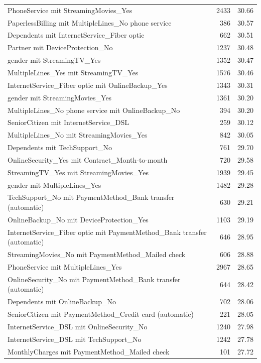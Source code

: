 \documentclass[a4paper,11pt]{article}
\begin{document}
\begin{longtable}{p{9cm}rr}
PhoneService mit StreamingMovies\_Yes & 2433 & 30.66 \\
PaperlessBilling mit MultipleLines\_No phone service & 386 & 30.57 \\
Dependents mit InternetService\_Fiber optic & 662 & 30.51 \\
Partner mit DeviceProtection\_No & 1237 & 30.48 \\
gender mit StreamingTV\_Yes & 1352 & 30.47 \\
MultipleLines\_Yes mit StreamingTV\_Yes & 1576 & 30.46 \\
InternetService\_Fiber optic mit OnlineBackup\_Yes & 1343 & 30.31 \\
gender mit StreamingMovies\_Yes & 1361 & 30.20 \\
MultipleLines\_No phone service mit OnlineBackup\_No & 394 & 30.20 \\
SeniorCitizen mit InternetService\_DSL & 259 & 30.12 \\
MultipleLines\_No mit StreamingMovies\_Yes & 842 & 30.05 \\
Dependents mit TechSupport\_No & 761 & 29.70 \\
OnlineSecurity\_Yes mit Contract\_Month-to-month & 720 & 29.58 \\
StreamingTV\_Yes mit StreamingMovies\_Yes & 1939 & 29.45 \\
gender mit MultipleLines\_Yes & 1482 & 29.28 \\
TechSupport\_No mit PaymentMethod\_Bank transfer (automatic) & 630 & 29.21 \\
OnlineBackup\_No mit DeviceProtection\_Yes & 1103 & 29.19 \\
InternetService\_Fiber optic mit PaymentMethod\_Bank transfer (automatic) & 646 & 28.95 \\
StreamingMovies\_No mit PaymentMethod\_Mailed check & 606 & 28.88 \\
PhoneService mit MultipleLines\_Yes & 2967 & 28.65 \\
OnlineSecurity\_No mit PaymentMethod\_Bank transfer (automatic) & 644 & 28.42 \\
Dependents mit OnlineBackup\_No & 702 & 28.06 \\
SeniorCitizen mit PaymentMethod\_Credit card (automatic) & 221 & 28.05 \\
InternetService\_DSL mit OnlineSecurity\_No & 1240 & 27.98 \\
InternetService\_DSL mit TechSupport\_No & 1242 & 27.78 \\
MonthlyCharges mit PaymentMethod\_Mailed check & 101 & 27.72 \\

\end{longtable}
\end{document}
